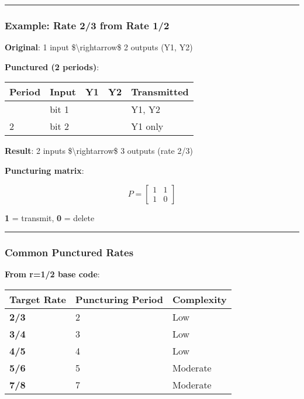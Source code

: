 \begin{center}\rule{0.5\linewidth}{0.5pt}\end{center}

\subsubsection{Example: Rate 2/3 from Rate
1/2}\label{example-rate-23-from-rate-12}

\textbf{Original}: 1 input \$\textbackslash rightarrow\$ 2 outputs (Y1,
Y2)

\textbf{Punctured (2 periods)}:

{\def\LTcaptype{} %
\begin{longtable}[]{@{}lllll@{}}
\toprule\noalign{}
Period & Input & Y1 & Y2 & Transmitted \\
\midrule\noalign{}
\endhead
\bottomrule\noalign{}
\endlastfoot
1 & bit 1 & & & Y1, Y2 \\
2 & bit 2 & & & Y1 only \\
\end{longtable}
}

\textbf{Result}: 2 inputs \$\textbackslash rightarrow\$ 3 outputs (rate
2/3)

\textbf{Puncturing matrix}:

\[
P = \begin{bmatrix} 1 & 1 \\ 1 & 0 \end{bmatrix}
\]

\textbf{1} = transmit, \textbf{0} = delete

\begin{center}\rule{0.5\linewidth}{0.5pt}\end{center}

\subsubsection{Common Punctured Rates}\label{common-punctured-rates}

\textbf{From r=1/2 base code}:

{\def\LTcaptype{} %
\begin{longtable}[]{@{}lll@{}}
\toprule\noalign{}
Target Rate & Puncturing Period & Complexity \\
\midrule\noalign{}
\endhead
\bottomrule\noalign{}
\endlastfoot
\textbf{2/3} & 2 & Low \\
\textbf{3/4} & 3 & Low \\
\textbf{4/5} & 4 & Low \\
\textbf{5/6} & 5 & Moderate \\
\textbf{7/8} & 7 & Moderate \\
\end{longtable}
}


